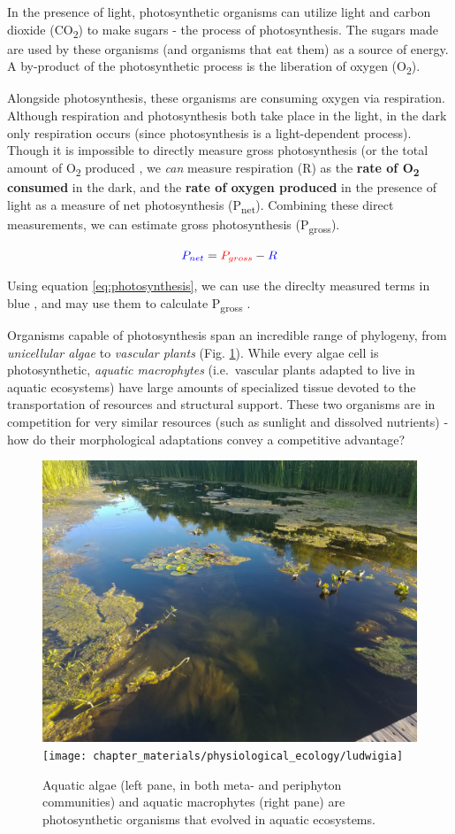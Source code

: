 \documentclass[]{book}
\begin{document}
\newcommand{\textunderscript}[1]{$_{\text{#1}}$}

In the presence of light, photosynthetic organisms can utilize light and carbon dioxide (CO\textsubscript{2}) to make sugars - the process of photosynthesis. The sugars made are used by these organisms (and organisms that eat them) as a source of energy. A by-product of the photosynthetic process is the liberation of oxygen (O\textsubscript{2}).

Alongside photosynthesis, these organisms are consuming oxygen via respiration. Although respiration and photosynthesis both take place in the light, in the dark only respiration occurs (since photosynthesis is a light-dependent process). Though it is impossible to directly measure gross photosynthesis (or the total amount of O\textsubscript{2} produced \citep{wohlfahrt_many_2015}, we \emph{can} measure respiration (R) as the \textbf{rate of O\textsubscript{2} consumed} in the dark, and the \textbf{rate of oxygen produced} in the presence of light as a measure of net photosynthesis (P\textsubscript{net}). Combining these direct measurements, we can estimate gross photosynthesis (P\textsubscript{gross}).

\begin{equation}
\color{blue} P_{net} \color{black}= \color{red}P_{gross} \color{black}- \color{blue}R
\label{eq:photosynthesis}
\end{equation}

Using equation \eqref{eq:photosynthesis}, we can use the direclty measured terms in \color{blue} blue \color{black}, and may use them to calculate \color{red} P\textsubscript{gross} \color{black}.

Organisms capable of photosynthesis span an incredible range of phylogeny, from \emph{unicellular algae} to \emph{vascular plants} (Fig. \ref{fig:organisms}). While every algae cell is photosynthetic, \emph{aquatic macrophytes} (i.e.~vascular plants adapted to live in aquatic ecosystems) have large amounts of specialized tissue devoted to the transportation of resources and structural support. These two organisms are in competition for very similar resources (such as sunlight and dissolved nutrients) - how do their morphological adaptations convey a competitive advantage?

\begin{figure}
\includegraphics[width=0.5\linewidth]{chapter_materials/physiological_ecology/aquatic_photosynthesis} \texttt{[image: chapter\_materials/physiological\_ecology/ludwigia]} \caption{Aquatic algae (left pane, in both meta- and periphyton communities) and aquatic macrophytes (right pane) are photosynthetic organisms that evolved in aquatic ecosystems.}\label{fig:organisms}
\end{figure}
\end{document}
